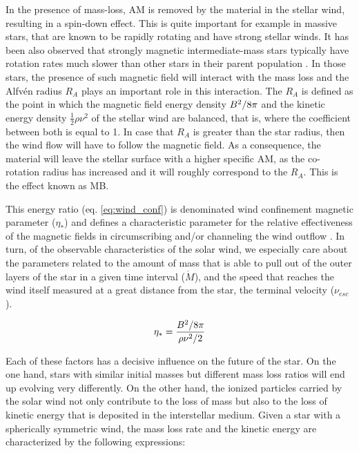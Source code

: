 \documentclass[fleqn,usenatbib]{mnras}
\begin{document}
In the presence of mass-loss, AM is removed by the material in the stellar wind, resulting in a spin-down effect. This is quite important for example in massive stars, that are known to be rapidly rotating and have strong stellar winds. It has been also observed that strongly magnetic intermediate-mass stars typically have rotation rates much slower than other stars in their parent population \citep{Mathys2006}. In those stars, the presence of such magnetic field will interact with the mass loss and the Alfv\'{e}n radius $R_{A}$ plays an important role in this interaction. The $R_{A}$ is defined as the point in which the magnetic field energy density $B^{2}/8\pi$ and the kinetic energy density $\frac{1}{2}\rho\nu^{2}$ of the stellar wind are balanced, that is, where the coefficient between both is equal to 1. In case that $R_{A}$ is greater than the star radius, then the wind flow will have to follow the magnetic field. As a consequence, the material will leave the stellar surface with a higher specific AM, as the co-rotation radius has increased and it will roughly correspond to the $R_{A}$. This is the effect known as MB.\par

This energy ratio (eq. \ref{eq:wind_conf}) is denominated wind confinement magnetic parameter ($\eta_*$) and defines a characteristic parameter for the relative effectiveness of the magnetic fields in circumscribing and/or channeling the wind outflow \citep{UdDoula2002}. In turn, of the observable characteristics of the solar wind, we especially care about the parameters related to the amount of mass that is able to pull out of the outer layers of the star in a given time interval ($\Dot{M}$), and the speed that reaches the wind itself measured at a great distance from the star, the terminal velocity ($\nu_{esc}$).\par

\begin{ceqn}
\begin{equation}
    \eta_* = \frac{B^{2}/8\pi}{\rho\nu^2/2} \label{eq:wind_conf}
\end{equation}
\end{ceqn}

Each of these factors has a decisive influence on the future of the star. On the one hand, stars with similar initial masses but different mass loss ratios will end up evolving very differently. On the other hand, the ionized particles carried by the solar wind not only contribute to the loss of mass but also to the loss of kinetic energy that is deposited in the interstellar medium. Given a star with a spherically symmetric wind, the mass loss rate and the kinetic energy are characterized by the following expressions:
\end{document}
